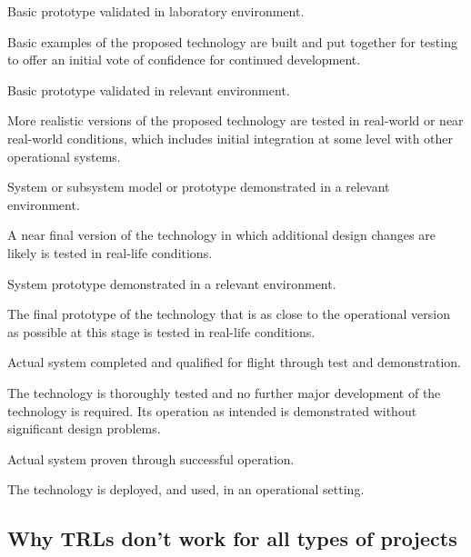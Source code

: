 \documentclass[referee,a4paper,12pt,traditabstract]{swsc}
\begin{document}
\begin{linenumbers}
\begin{description}
{\bf \item[TRL 4 -] Basic prototype validated in laboratory environment.} Basic examples of the proposed technology are built and put together for testing to offer an initial vote of confidence for continued development.

{\bf \item[TRL 5 -] Basic prototype validated in relevant environment.} More realistic versions of the proposed technology are tested in real-world or near real-world conditions, which includes initial integration at some level with other operational systems.

{\bf \item[TRL 6 -] System or subsystem model or prototype demonstrated in a relevant environment.} A near final version of the technology in which additional design changes are likely is tested in real-life conditions.

{\bf \item[TRL 7 -] System prototype demonstrated in a relevant environment.} The final prototype of the technology that is as close to the operational version as possible at this stage is tested in real-life conditions.

{\bf \item[TRL 8 -] Actual system completed and qualified for flight through test and demonstration.} The technology is thoroughly tested and no further major development of the technology is required. Its operation as intended is demonstrated without significant design problems.

{\bf \item[TRL 9 -] Actual system proven through successful operation.} The technology is deployed, and used, in an operational setting.
\end{description}

\subsection{Why TRLs don't work for all types of projects}


\end{linenumbers}
\end{document}
